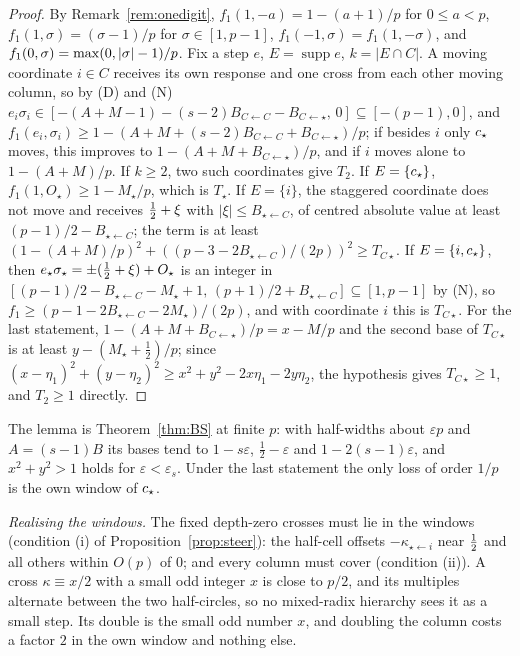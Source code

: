 \begin{proof}
By Remark~\ref{rem:onedigit}, $f_1(1,-a)=1-(a+1)/p$ for $0\le a<p$, $f_1(1,\sigma)=(\sigma-1)/p$ for $\sigma\in[1,p-1]$, $f_1(-1,\sigma)=f_1(1,-\sigma)$, and $f_1(0,\sigma)=\max(0,\lvert \sigma\rvert-1)/p$. Fix a step $e$, $E=\operatorname{supp}e$, $k=|E\cap C|$. A moving coordinate $i\in C$ receives its own response and one cross from each other moving column, so by (D) and (N) $e_i\sigma_i\in[-(A+M-1)-(s-2)B_{C\leftarrow C}-B_{C\leftarrow\star},\,0]\subseteq[-(p-1),0]$, and $f_1(e_i,\sigma_i)\ge1-(A+M+(s-2)B_{C\leftarrow C}+B_{C\leftarrow\star})/p$; if besides $i$ only $c_{\star}$ moves, this improves to $1-(A+M+B_{C\leftarrow\star})/p$, and if $i$ moves alone to $1-(A+M)/p$. If $k\ge2$, two such coordinates give $T_2$. If $E=\{c_{\star}\}$, $f_1(1,O_\star)\ge1-M_\star/p$, which is $T_\star$. If $E=\{i\}$, the staggered coordinate does not move and receives $\tfrac12+\xi$ with $|\xi|\le B_{\star\leftarrow C}$, of centred absolute value at least $(p-1)/2-B_{\star\leftarrow C}$; the term is at least $(1-(A+M)/p)^2+((p-3-2B_{\star\leftarrow C})/(2p))^2\ge T_{C\star}$. If $E=\{i,c_{\star}\}$, then $e_\star\sigma_\star=\pm(\tfrac12+\xi)+O_\star$ is an integer in $[(p-1)/2-B_{\star\leftarrow C}-M_\star+1,\,(p+1)/2+B_{\star\leftarrow C}]\subseteq[1,p-1]$ by (N), so $f_1\ge(p-1-2B_{\star\leftarrow C}-2M_\star)/(2p)$, and with coordinate $i$ this is $T_{C\star}$. For the last statement, $1-(A+M+B_{C\leftarrow\star})/p=x-M/p$ and the second base of $T_{C\star}$ is at least $y-(M_\star+\frac12)/p$; since $(x-\eta_1)^2+(y-\eta_2)^2\ge x^2+y^2-2x\eta_1-2y\eta_2$, the hypothesis gives $T_{C\star}\ge1$, and $T_2\ge1$ directly.
\end{proof}

The lemma is Theorem~\ref{thm:BS} at finite $p$: with half-widths about $\varepsilon p$ and $A=(s-1)B$ its bases tend to $1-s\varepsilon$, $\frac12-\varepsilon$ and $1-2(s-1)\varepsilon$, and $x^2+y^2>1$ holds for $\varepsilon<\varepsilon_s$. Under the last statement the only loss of order $1/p$ is the own window of $c_{\star}$.

\emph{Realising the windows.} The fixed depth-zero crosses must lie in the windows (condition (i) of Proposition~\ref{prop:steer}): the half-cell offsets $-\kappa_{\star\leftarrow i}$ near $\tfrac12$ and all others within $O(p)$ of $0$; and every column must cover (condition (ii)). A cross $\kappa\equiv x/2$ with a small odd integer $x$ is close to $p/2$, and its multiples alternate between the two half-circles, so no mixed-radix hierarchy sees it as a small step. Its double is the small odd number $x$, and doubling the column costs a factor $2$ in the own window and nothing else.

